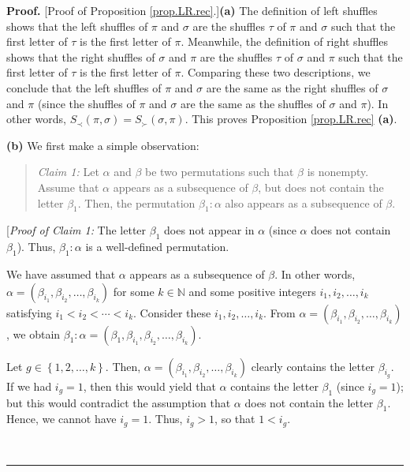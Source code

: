 \documentclass[numbers=enddot,12pt,final,onecolumn,notitlepage]{scrartcl}%
\theoremstyle{definition}
\newenvironment{statement}{\begin{quote}}{\end{quote}}
\newenvironment{proof}[1][Proof]{\noindent\textbf{#1.} }{\ \rule{0.5em}{0.5em}}
\begin{document}
\begin{proof}
[Proof of Proposition \ref{prop.LR.rec}.]\textbf{(a)} The definition of left
shuffles shows that the left shuffles of $\pi$ and $\sigma$ are the shuffles
$\tau$ of $\pi$ and $\sigma$ such that the first letter of $\tau$ is the first
letter of $\pi$. Meanwhile, the definition of right shuffles shows that the
right shuffles of $\sigma$ and $\pi$ are the shuffles $\tau$ of $\sigma$ and
$\pi$ such that the first letter of $\tau$ is the first letter of $\pi$.
Comparing these two descriptions, we conclude that the left shuffles of $\pi$
and $\sigma$ are the same as the right shuffles of $\sigma$ and $\pi$ (since
the shuffles of $\pi$ and $\sigma$ are the same as the shuffles of $\sigma$
and $\pi$). In other words, $S_{\prec}\left(  \pi,\sigma\right)  =S_{\succ
}\left(  \sigma,\pi\right)  $. This proves Proposition \ref{prop.LR.rec}
\textbf{(a)}.

\textbf{(b)} We first make a simple observation:

\begin{statement}
\textit{Claim 1:} Let $\alpha$ and $\beta$ be two permutations such that
$\beta$ is nonempty. Assume that $\alpha$ appears as a subsequence of $\beta$,
but does not contain the letter $\beta_{1}$. Then, the permutation $\beta
_{1}:\alpha$ also appears as a subsequence of $\beta$.
\end{statement}

[\textit{Proof of Claim 1:} The letter $\beta_{1}$ does not appear in $\alpha$
(since $\alpha$ does not contain $\beta_{1}$). Thus, $\beta_{1}:\alpha$ is a
well-defined permutation.

We have assumed that $\alpha$ appears as a subsequence of $\beta$. In other
words, $\alpha=\left(  \beta_{i_{1}},\beta_{i_{2}},\ldots,\beta_{i_{k}%
}\right)  $ for some $k\in\mathbb{N}$ and some positive integers $i_{1}%
,i_{2},\ldots,i_{k}$ satisfying $i_{1}<i_{2}<\cdots<i_{k}$. Consider these
$i_{1},i_{2},\ldots,i_{k}$. From $\alpha=\left(  \beta_{i_{1}},\beta_{i_{2}%
},\ldots,\beta_{i_{k}}\right)  $, we obtain $\beta_{1}:\alpha=\left(
\beta_{1},\beta_{i_{1}},\beta_{i_{2}},\ldots,\beta_{i_{k}}\right)  $.

Let $g\in\left\{  1,2,\ldots,k\right\}  $. Then, $\alpha=\left(  \beta_{i_{1}%
},\beta_{i_{2}},\ldots,\beta_{i_{k}}\right)  $ clearly contains the letter
$\beta_{i_{g}}$. If we had $i_{g}=1$, then this would yield that $\alpha$
contains the letter $\beta_{1}$ (since $i_{g}=1$); but this would contradict
the assumption that $\alpha$ does not contain the letter $\beta_{1}$. Hence,
we cannot have $i_{g}=1$. Thus, $i_{g}>1$, so that $1<i_{g}$.


\end{proof}
\end{document}
